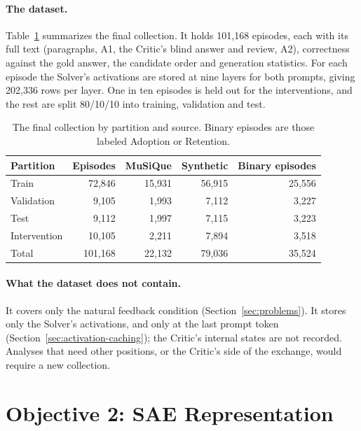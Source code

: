 \paragraph{The dataset.} Table~\ref{tab:dataset} summarizes the final
collection. It holds 101,168 episodes, each with its full text (paragraphs,
A1, the Critic's blind answer and review, A2), correctness against the gold
answer, the candidate order and generation statistics. For each episode the
Solver's activations are stored at nine layers for both prompts, giving
202,336 rows per layer. One in ten episodes is held out for the
interventions, and the rest are split 80/10/10 into training, validation and
test.

\begin{table}[htbp]
    \centering
    \caption{The final collection by partition and source. Binary episodes are
    those labeled Adoption or Retention.}
    \label{tab:dataset}
    \begin{tabular}{lrrrr}
        \toprule
        Partition & Episodes & MuSiQue & Synthetic & Binary episodes \\
        \midrule
        Train        & 72,846  & 15,931 & 56,915 & 25,556 \\
        Validation   & 9,105   & 1,993  & 7,112  & 3,227 \\
        Test         & 9,112   & 1,997  & 7,115  & 3,223 \\
        Intervention & 10,105  & 2,211  & 7,894  & 3,518 \\
        \midrule
        Total        & 101,168 & 22,132 & 79,036 & 35,524 \\
        \bottomrule
    \end{tabular}
\end{table}

\paragraph{What the dataset does not contain.} It covers only the natural
feedback condition (Section~\ref{sec:problems}). It stores only the Solver's
activations, and only at the last prompt token
(Section~\ref{sec:activation-caching}); the Critic's internal states are not
recorded. Analyses that need other positions, or the Critic's side of the
exchange, would require a new collection.
\section{Objective 2: SAE Representation}

